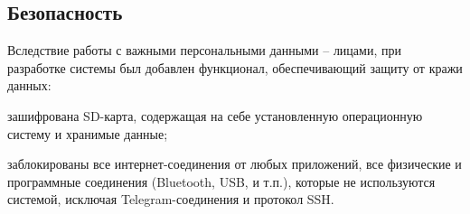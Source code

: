 \subsection{Безопасность}

Вследствие работы с важными персональными данными -- лицами, при разработке
системы был добавлен функционал, обеспечивающий защиту от кражи данных:

\begin{itemize*}
\item зашифрована SD-карта, содержащая на себе установленную операционную
систему и хранимые данные;
\item заблокированы все интернет-соединения от любых приложений, все физические
и программные соединения (Bluetooth, USB, и т.п.), которые не используются
системой, исключая Telegram-соединения и протокол SSH.
\end{itemize*}

